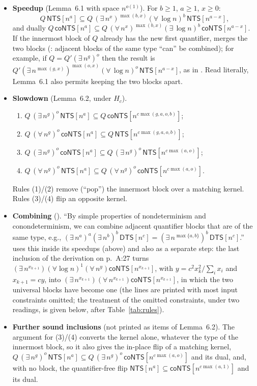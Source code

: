 \documentclass[11pt]{article}
\theoremstyle{definition}
\newcommand{\NTS}{\mathsf{NTS}}
\newcommand{\coNTS}{\mathsf{coNTS}}
\begin{document}
\begin{itemize}
\item \textbf{Speedup} (Lemma~6.1 with space $n^{o(1)}$). For $b\ge1$, $a\ge1$, $x\ge0$:
\[ Q\,\NTS[n^a]\subseteq Q\,(\exists\, n^{x})^{\max(b,x)}(\forall\,\log n)^{b}\,\NTS[n^{a-x}], \]
and dually $Q\,\coNTS[n^a]\subseteq Q\,(\forall\, n^{x})^{\max(b,x)}(\exists\,\log n)^{b}\,\coNTS[n^{a-x}]$.
If the innermost block of $Q$ already has the new first quantifier, \cite{W13} merges the two blocks (\cite[\S2]{W13}: adjacent blocks of the same type ``can'' be combined); for example, if $Q=Q'(\exists\, n^{g})^{o}$ then the result is $Q'(\exists\, n^{\max(g,x)})^{\max(o,x)}(\forall\,\log n)^{o}\,\NTS[n^{a-x}]$, as in \cite[eq.~(14)]{W13}. Read literally, Lemma~6.1 also permits keeping the two blocks apart.
\item \textbf{Slowdown} (Lemma~6.2, under $H_c$).
\begin{enumerate}
\item[(1)] $Q\,(\exists\, n^{g})^{o}\,\NTS[n^{a}]\subseteq Q\,\coNTS[n^{c\max(g,a,o,b)}]$;
\item[(2)] $Q\,(\forall\, n^{g})^{o}\,\coNTS[n^{a}]\subseteq Q\,\NTS[n^{c\max(g,a,o,b)}]$;
\item[(3)] $Q\,(\exists\, n^{g})^{o}\,\coNTS[n^{a}]\subseteq Q\,(\exists\, n^{g})^{o}\,\NTS[n^{c\max(a,o)}]$;
\item[(4)] $Q\,(\forall\, n^{g})^{o}\,\NTS[n^{a}]\subseteq Q\,(\forall\, n^{g})^{o}\,\coNTS[n^{c\max(a,o)}]$.
\end{enumerate}
Rules (1)/(2) remove (``pop'') the innermost block over a matching kernel. Rules (3)/(4) flip an opposite kernel.
\item \textbf{Combining} (\cite[\S2]{W13}). ``By simple properties of nondeterminism and conondeterminism, we can combine adjacent quantifier blocks that are of the same type, e.g., $(\exists\, n^a)^a(\exists\, n^b)^b\,\mathsf{DTS}[n^c]=(\exists\, n^{\max\{a,b\}})^b\,\mathsf{DTS}[n^c]$.'' \cite{W13} uses this inside its speedups (above) and also as a separate step: the last inclusion of the derivation on p.~A:27 turns $(\exists\,n^{x_{k+1}})(\forall\log n)^1(\forall\,n^{y})\coNTS[n^{x_{k+1}}]$, with $y=c^2x_k^2/\sum_i x_i$ and $x_{k+1}=cy$, into $(\exists\,n^{x_{k+1}})(\forall\,n^{x_{k+1}})\coNTS[n^{x_{k+1}}]$, in which the two universal blocks have become one (the lines are printed with most input constraints omitted; the treatment of the omitted constraints, under two readings, is given below, after Table~\ref{tab:rules}).
\item \textbf{Further sound inclusions} (not printed as items of Lemma~6.2). The argument for (3)/(4) converts the kernel alone, whatever the type of the innermost block, so it also gives the in-place flip of a matching kernel, $Q\,(\exists\, n^{g})^{o}\,\NTS[n^{a}]\subseteq Q\,(\exists\, n^{g})^{o}\,\coNTS[n^{c\max(a,o)}]$ and its dual, and, with no block, the quantifier-free flip $\NTS[n^a]\subseteq\coNTS[n^{c\max(a,1)}]$ and its dual.
\end{itemize}
\end{document}
